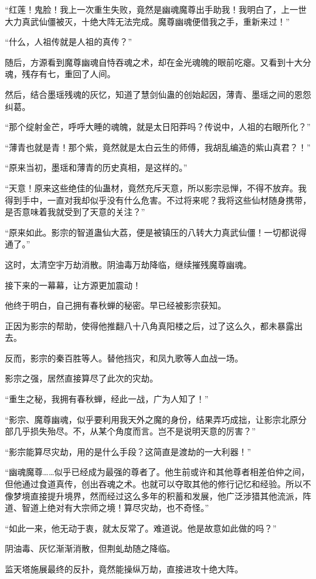 \begin{this_body}
“红莲！鬼脸！我上一次重生失败，竟然是幽魂魔尊出手助我！我明白了，上一世大力真武仙僵被灭，十绝大阵无法完成。魔尊幽魂便借我之手，重新来过！”

“什么，人祖传就是人祖的真传？”

随后，方源看到魔尊幽魂自恃吞魂之术，却在金光魂魄的眼前吃瘪。又看到十大分魂，残存有七，重回了人间。

然后，结合墨瑶残魂的灰忆，知道了慧剑仙蛊的创始起因，薄青、墨瑶之间的恩怨纠葛。

“那个绽射金芒，呼呼大睡的魂魄，就是太日阳莽吗？传说中，人祖的右眼所化？”

“薄青也就是青！那个紫，竟然就是太白云生的师傅，我胡乱编造的紫山真君？！”

“原来当初，墨瑶和薄青的历史真相，是这样的。”

“天意！原来这些绝佳的仙蛊材，竟然充斥天意，所以影宗忌惮，不得不放弃。我得到手中，一直对我却似乎没有什么危害。不过将来呢？我将这些仙材随身携带，是否意味着我就受到了天意的关注？”

“原来如此。影宗的智道蛊仙大荔，便是被镇压的八转大力真武仙僵！一切都说得通了。”

这时，太清空宇万劫消散。阴油毒万劫降临，继续摧残魔尊幽魂。

接下来的一幕幕，让方源更加震动！

他终于明白，自己拥有春秋蝉的秘密。早已经被影宗获知。

正因为影宗的帮助，使得他推翻八十八角真阳楼之后，过了这么久，都未暴露出去。

反而，影宗的秦百胜等人。替他挡灾，和凤九歌等人血战一场。

影宗之强，居然直接算尽了此次的灾劫。

“重生之秘，我拥有春秋蝉，经此一战，广为人知了！”

“影宗、魔尊幽魂，似乎要利用我天外之魔的身份，结果弄巧成拙，让影宗北原分部几乎损失殆尽。不，从某个角度而言。岂不是说明天意的厉害？”

“影宗能算尽灾劫，用的是什么手段？这简直是渡劫的一大利器！”

“幽魂魔尊……似乎已经成为最强的尊者了。他生前或许和其他尊者相差伯仲之间，但他通过食道真传，创出吞魂之术。也就可以夺取其他的修行记忆和经验。所以不像梦境直接提升境界，然而经过这么多年的积蓄和发展，他广泛涉猎其他流派，阵道、智道上绝对有大宗师之境！算尽灾劫，也不奇怪。”

“如此一来，他无动于衷，就太反常了。难道说。他是故意如此做的吗？”

阴油毒、灰忆渐渐消散，但荆虬劫随之降临。

监天塔施展最终的反扑，竟然能操纵万劫，直接进攻十绝大阵。


\end{this_body}
